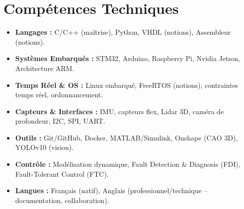 \documentclass[a4paper,11pt]{article}
\begin{document}
\section{Compétences Techniques}
\begin{itemize}[leftmargin=*, nosep]
    \item \small{\textbf{Langages :} C/C++ (maîtrise), Python, VHDL (notions), Assembleur (notions).}
    \item \small{\textbf{Systèmes Embarqués :} STM32, Arduino, Raspberry Pi, Nvidia Jetson, Architecture ARM.}
    \item \small{\textbf{Temps Réel \& OS :} Linux embarqué, FreeRTOS (notions), contraintes temps réel, ordonnancement.}
    \item \small{\textbf{Capteurs \& Interfaces :} IMU, capteurs flex, Lidar 3D, caméra de profondeur, I2C, SPI, UART.}
    \item \small{\textbf{Outils :} Git/GitHub, Docker, MATLAB/Simulink, Onshape (CAO 3D), YOLOv10 (vision).}
    \item \small{\textbf{Contrôle :} Modélisation dynamique, Fault Detection \& Diagnosis (FDI), Fault-Tolerant Control (FTC).}
    \item \small{\textbf{Langues :} Français (natif), Anglais (professionnel/technique -- documentation, collaboration).}
\end{itemize}

\end{document}
